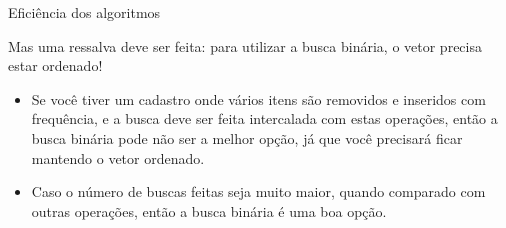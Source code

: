 \documentclass[handout]{beamer}
\begin{document}
\begin{frame}[fragile]{Eficiência dos algoritmos}

    Mas uma ressalva deve ser feita: para utilizar a busca binária, o vetor precisa estar ordenado!

    \begin{itemize}
        \item Se você tiver um cadastro onde vários itens são removidos e inseridos com frequência, e a busca deve ser feita intercalada com estas operações, então a busca binária pode não ser a melhor opção, já que você precisará ficar mantendo o vetor ordenado.
        \item Caso o número de buscas feitas seja muito maior, quando comparado com outras operações, então a busca binária é uma boa opção. 
    \end{itemize}

\end{frame}
\end{document}
